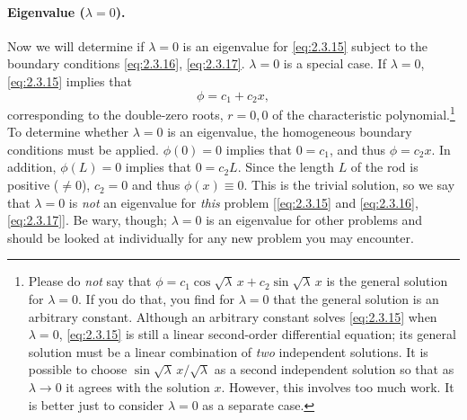 \paragraph{Eigenvalue ($\lambda = 0$).}
Now we will determine if $\lambda = 0$ is an eigenvalue for \eqref{eq:2.3.15} subject to the boundary conditions \eqref{eq:2.3.16}, \eqref{eq:2.3.17}. $\lambda = 0$ is a special case. If $\lambda = 0$, \eqref{eq:2.3.15} implies that
\[
\phi = c_1 + c_2 x,
\]
corresponding to the double-zero roots, $r = 0, 0$ of the characteristic polynomial.\footnote{Please do \emph{not} say that $\phi = c_1\cos\sqrt{\lambda}\,x + c_2\sin\sqrt{\lambda}\,x$ is the general solution for $\lambda = 0$. If you do that, you find for $\lambda = 0$ that the general solution is an arbitrary constant. Although an arbitrary constant solves \eqref{eq:2.3.15} when $\lambda = 0$, \eqref{eq:2.3.15} is still a linear second-order differential equation; its general solution must be a linear combination of \emph{two} independent solutions. It is possible to choose $\sin\sqrt{\lambda}\,x/\sqrt{\lambda}$ as a second independent solution so that as $\lambda \to 0$ it agrees with the solution $x$. However, this involves too much work. It is better just to consider $\lambda = 0$ as a separate case.} To determine whether $\lambda = 0$ is an eigenvalue, the homogeneous boundary conditions must be applied. $\phi(0) = 0$ implies that $0 = c_1$, and thus $\phi = c_2 x$. In addition, $\phi(L) = 0$ implies that $0 = c_2 L$. Since the length $L$ of the rod is positive ($\ne 0$), $c_2 = 0$ and thus $\phi(x) \equiv 0$. This is the trivial solution, so we say that $\lambda = 0$ is \emph{not} an eigenvalue for \emph{this} problem [\eqref{eq:2.3.15} and \eqref{eq:2.3.16}, \eqref{eq:2.3.17}]. Be wary, though; $\lambda = 0$ is an eigenvalue for other problems and should be looked at individually for any new problem you may encounter.

